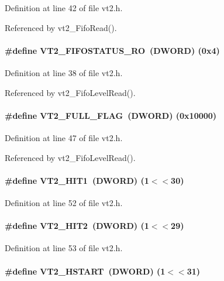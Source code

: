 Definition at line 42 of file vt2.h.

Referenced by vt2\_\-FifoRead().
\paragraph[{VT2\_\-FIFOSTATUS\_\-RO}]{\setlength{\rightskip}{0pt plus 5cm}\#define VT2\_\-FIFOSTATUS\_\-RO~({\bf DWORD}) (0x4)}\hfill\label{vt2_8h_a80f2861b134563d08563fe1e7e69718b}


Definition at line 38 of file vt2.h.

Referenced by vt2\_\-FifoLevelRead().
\paragraph[{VT2\_\-FULL\_\-FLAG}]{\setlength{\rightskip}{0pt plus 5cm}\#define VT2\_\-FULL\_\-FLAG~({\bf DWORD}) (0x10000)}\hfill\label{vt2_8h_acac86a699114317cb4dcf46368442e6d}


Definition at line 47 of file vt2.h.

Referenced by vt2\_\-FifoLevelRead().
\paragraph[{VT2\_\-HIT1}]{\setlength{\rightskip}{0pt plus 5cm}\#define VT2\_\-HIT1~({\bf DWORD}) (1$<$$<$30)}\hfill\label{vt2_8h_adbb119fe757606e1509db32f00c3b049}


Definition at line 52 of file vt2.h.
\paragraph[{VT2\_\-HIT2}]{\setlength{\rightskip}{0pt plus 5cm}\#define VT2\_\-HIT2~({\bf DWORD}) (1$<$$<$29)}\hfill\label{vt2_8h_a7ed175f3f3460154f4cf41a439e05d0d}


Definition at line 53 of file vt2.h.
\paragraph[{VT2\_\-HSTART}]{\setlength{\rightskip}{0pt plus 5cm}\#define VT2\_\-HSTART~({\bf DWORD}) (1$<$$<$31)}\hfill\label{vt2_8h_a6cf255ff32daeefc00c476cda7cc8c25}


